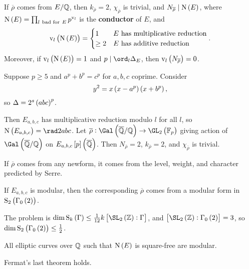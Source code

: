 \begin{example*}
If $ \overline{\rho} $ comes from $ E / \mathbb{Q} $, then $ k_{\overline{\rho}} = 2 $, $ \chi_{\overline{\rho}} $ is trivial, and $ N_{\overline{\rho}} \mid \N\br{E} $, where $ \N\br{E} = \prod_{l \ \text{bad for} \ E} p^{\v_l} $ is the \textbf{conductor} of $ E $, and
$$ \v_l\br{\N\br{E}} =
\begin{cases}
1 & E \ \text{has multiplicative reduction} \\
\ge 2 & E \ \text{has additive reduction}
\end{cases}.
$$
Moreover, if $ \v_l\br{\N\br{E}} = 1 $ and $ p \mid \ord_l \Delta_E $, then $ \v_l\br{N_{\overline{\rho}}} = 0 $.
\end{example*}

\begin{definition}[Frey 1985]
Suppose $ p \ge 5 $ and $ a^p + b^p = c^p $ for $ a, b, c $ coprime. Consider
$$ y^2 = x\br{x - a^p}\br{x + b^p}, $$
so $ \Delta = 2^s\br{abc}^p $.
\end{definition}

Then $ E_{a, b, c} $ has multiplicative reduction modulo $ l $ for all $ l $, so $ \N\br{E_{a, b, c}} = \rad 2abc $. Let $ \overline{\rho} : \Gal\br{\overline{\QQ} / \QQ} \to \GL_2\br{\FF_p} $ giving action of $ \Gal\br{\overline{\QQ} / \QQ} $ on $ E_{a, b, c}\sbr{p}\br{\overline{\QQ}} $. Then $ N_{\overline{\rho}} = 2 $, $ k_{\overline{\rho}} = 2 $, and $ \chi_{\overline{\rho}} $ is trivial.

\begin{theorem}[Ribet 1986]
If $ \overline{\rho} $ comes from any newform, it comes from the level, weight, and character predicted by Serre.
\end{theorem}

\begin{corollary}
If $ E_{a, b, c} $ is modular, then the corresponding $ \overline{\rho} $ comes from a modular form in $ \S_2\br{\Gamma_0\br{2}} $.
\end{corollary}

The problem is $ \dim \S_k\br{\Gamma} \le \tfrac{1}{12}k\sbr{\SL_2\br{\ZZ} : \Gamma} $, and $ \sbr{\SL_2\br{\ZZ} : \Gamma_0\br{2}} = 3 $, so $ \dim \S_2\br{\Gamma_0\br{2}} \le \tfrac{1}{2} $.

\begin{theorem}
All elliptic curves over $ \mathbb{Q} $ such that $ \N\br{E} $ is square-free are modular.
\end{theorem}

\begin{corollary}
Fermat's last theorem holds.
\end{corollary}

